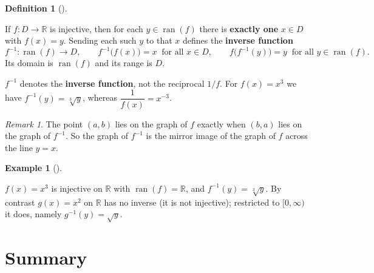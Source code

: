 \documentclass[
  letterpaper,
  DIV=11,
  numbers=noendperiod]{scrreprt}
\theoremstyle{plain}
\theoremstyle{plain}
\theoremstyle{definition}
\newtheorem{definition}{Definition}[chapter]
\theoremstyle{definition}
\theoremstyle{definition}
\newtheorem{example}{Example}[chapter]
\theoremstyle{plain}
\theoremstyle{plain}
\theoremstyle{remark}
\newtheorem{refremark}{Remark}[chapter]
\begin{document}
\begin{definition}[]\protect\hypertarget{def-inverse}{}\label{def-inverse}

\hfill\break
If \(f\colon D\to\mathbb{R}\) is injective, then for each
\(y\in\operatorname{ran}(f)\) there is \textbf{exactly one} \(x\in D\)
with \(f(x)=y\). Sending each such \(y\) to that \(x\) defines the
\textbf{inverse function} \[
f^{-1}\colon \operatorname{ran}(f)\to D, \qquad f^{-1}\bigl(f(x)\bigr) = x \ \text{ for all } x\in D, \qquad
f\bigl(f^{-1}(y)\bigr) = y \ \text{ for all } y\in\operatorname{ran}(f).
\] Its domain is \(\operatorname{ran}(f)\) and its range is \(D\).

\end{definition}

\begin{tcolorbox}[enhanced jigsaw, arc=.35mm, bottomrule=.15mm, bottomtitle=1mm, breakable, colback=white, colbacktitle=quarto-callout-warning-color!10!white, colframe=quarto-callout-warning-color-frame, coltitle=black, left=2mm, leftrule=.75mm, opacityback=0, opacitybacktitle=0.6, rightrule=.15mm, title={Notation trap}, titlerule=0mm, toprule=.15mm, toptitle=1mm]

\(f^{-1}\) denotes the \textbf{inverse function}, not the reciprocal
\(1/f\). For \(f(x)=x^3\) we have \(f^{-1}(y)=\sqrt[3]{y}\), whereas
\(\dfrac{1}{f(x)} = x^{-3}\).

\end{tcolorbox}

\begin{refremark}
The point \((a,b)\) lies on the graph of \(f\) exactly when \((b,a)\)
lies on the graph of \(f^{-1}\). So the graph of \(f^{-1}\) is the
mirror image of the graph of \(f\) across the line \(y=x\).

\label{rem-inverse-graph}

\end{refremark}

\begin{example}[]\protect\hypertarget{exm-inverse}{}\label{exm-inverse}

\hfill\break
\(f(x)=x^3\) is injective on \(\mathbb{R}\) with
\(\operatorname{ran}(f)=\mathbb{R}\), and \(f^{-1}(y)=\sqrt[3]{y}\). By
contrast \(g(x)=x^2\) on \(\mathbb{R}\) has no inverse (it is not
injective); restricted to \([0,\infty)\) it does, namely
\(g^{-1}(y)=\sqrt{y}\).

\end{example}

\section{Summary}\label{summary-2}
\end{document}
